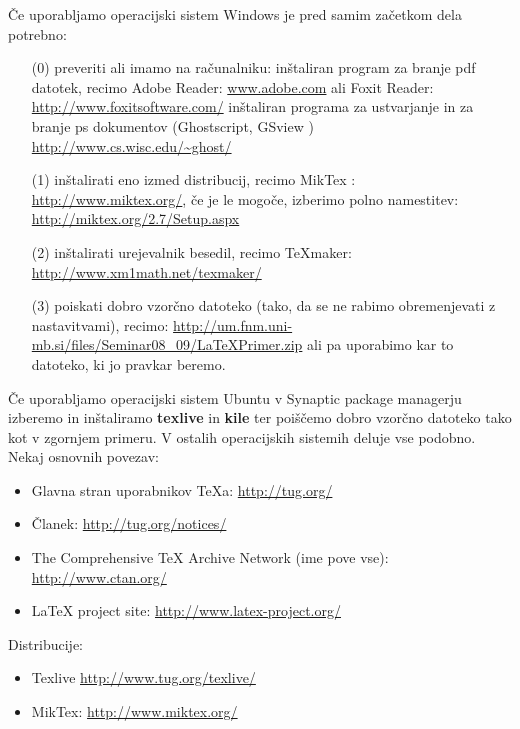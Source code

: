 \v Ce uporabljamo operacijski sistem Windows je  pred samim za\v
cetkom dela potrebno: \begin{itemize}
\item[(0)] preveriti ali imamo na ra\v cunalniku:
  \subitem in\v staliran program za branje pdf datotek, recimo Adobe
  Reader: \url{www.adobe.com} ali
  Foxit Reader: \url{http://www.foxitsoftware.com/}
  \subitem in\v staliran programa za ustvarjanje in za branje ps dokumentov
  (Ghostscript, GSview ) \url{http://www.cs.wisc.edu/~ghost/}
\item[(1)] in\v stalirati eno izmed distribucij, recimo MikTex :
  \url{http://www.miktex.org/}, \v ce je le mogo\v ce, izberimo polno
  namestitev:  \url{http://miktex.org/2.7/Setup.aspx}
\item[(2)] in\v stalirati urejevalnik besedil, recimo TeXmaker:
  \url{http://www.xm1math.net/texmaker/}
\item[(3)] poiskati dobro vzor\v cno datoteko (tako, da se ne rabimo
  obremenjevati z nastavitvami), recimo:
  \url{http://um.fnm.uni-mb.si/files/Seminar08_09/LaTeXPrimer.zip} ali
  pa uporabimo kar to datoteko, ki jo pravkar beremo.
\end{itemize}

\v Ce uporabljamo operacijski sistem Ubuntu v Synaptic package
managerju izberemo in in\v staliramo {\bf texlive} in {\bf kile} ter
poi\v s\v cemo dobro vzor\v cno datoteko tako kot v zgornjem
primeru. V ostalih operacijskih sistemih deluje vse podobno.\\

Nekaj osnovnih povezav:
\begin{itemize}
\item Glavna stran uporabnikov \TeX a:
  \url{http://tug.org/}

\item \v Clanek:
  \url{http://tug.org/notices/}

\item The Comprehensive TeX Archive Network (ime pove vse):
  \url{http://www.ctan.org/}

\item LaTeX project site:
  \url{http://www.latex-project.org/}

\end{itemize}

Distribucije:
\begin{itemize}
\item Texlive \url{http://www.tug.org/texlive/}
\item MikTex: \url{http://www.miktex.org/}
\end{itemize}

